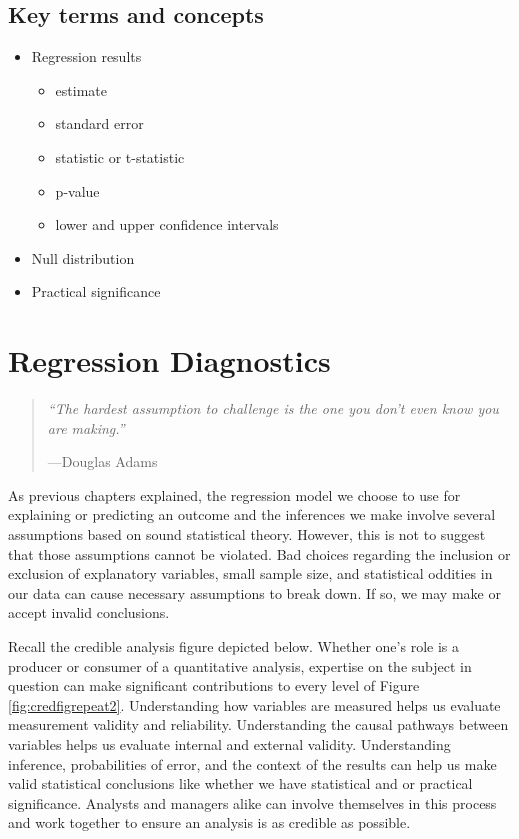 \documentclass[
]{book}
\providecommand{\tightlist}{%
  \setlength{\itemsep}{0pt}\setlength{\parskip}{0pt}}
\begin{document}
\hypertarget{kt12}{%
\section{Key terms and concepts}\label{kt12}}

\begin{itemize}
\tightlist
\item
  Regression results

  \begin{itemize}
  \tightlist
  \item
    estimate
  \item
    standard error
  \item
    statistic or t-statistic
  \item
    p-value
  \item
    lower and upper confidence intervals
  \end{itemize}
\item
  Null distribution
\item
  Practical significance
\end{itemize}

\hypertarget{regression-diagnostics}{%
\chapter{Regression Diagnostics}\label{regression-diagnostics}}

\begin{quote}
\emph{``The hardest assumption to challenge is the one you don't even know you are making.''}

---Douglas Adams
\end{quote}

As previous chapters explained, the regression model we choose to use for explaining or predicting an outcome and the inferences we make involve several assumptions based on sound statistical theory. However, this is not to suggest that those assumptions cannot be violated. Bad choices regarding the inclusion or exclusion of explanatory variables, small sample size, and statistical oddities in our data can cause necessary assumptions to break down. If so, we may make or accept invalid conclusions.

Recall the credible analysis figure depicted below. Whether one's role is a producer or consumer of a quantitative analysis, expertise on the subject in question can make significant contributions to every level of Figure \ref{fig:credfigrepeat2}. Understanding how variables are measured helps us evaluate measurement validity and reliability. Understanding the causal pathways between variables helps us evaluate internal and external validity. Understanding inference, probabilities of error, and the context of the results can help us make valid statistical conclusions like whether we have statistical and or practical significance. Analysts and managers alike can involve themselves in this process and work together to ensure an analysis is as credible as possible.
\end{document}
